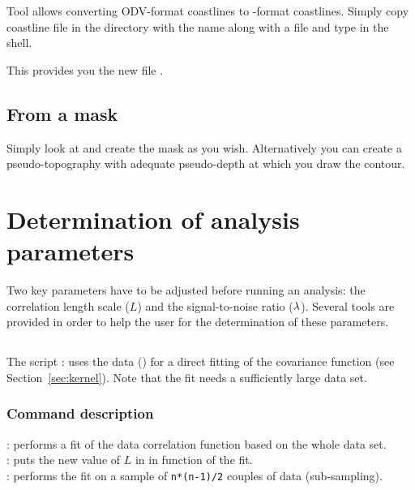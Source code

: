 Tool  allows converting ODV-format coastlines to \diva-format coastlines. Simply copy coastline file in the  directory with the name  along with a  file and type  in the shell. 

This provides you the new file .



\subsection{From a mask}

Simply look at  and create the mask as you wish. Alternatively you can
create a pseudo-topography with adequate pseudo-depth at which you draw the contour.


\section{Determination of analysis parameters\label{sec:determiationparameters}}

Two key parameters have to be adjusted before running an analysis: the correlation length scale ($L$) and the signal-to-noise ratio ($\lambda$). Several tools are provided in order to help the user for the determination of these parameters.


\subsection{ \label{sec:divafit}}

The script : uses the data () for a direct fitting of the covariance function (see Section~\ref{sec:kernel}). Note that the fit needs a sufficiently large data set.

\subsubsection{Command description}

 \qquad: performs a fit of the data correlation function based on the whole data set. \\
 \qquad: puts the new value of $L$ in  in function of the fit.\\
 \qquad: performs the fit on a sample of \texttt{n*(n-1)/2} couples of data (sub-sampling). 

